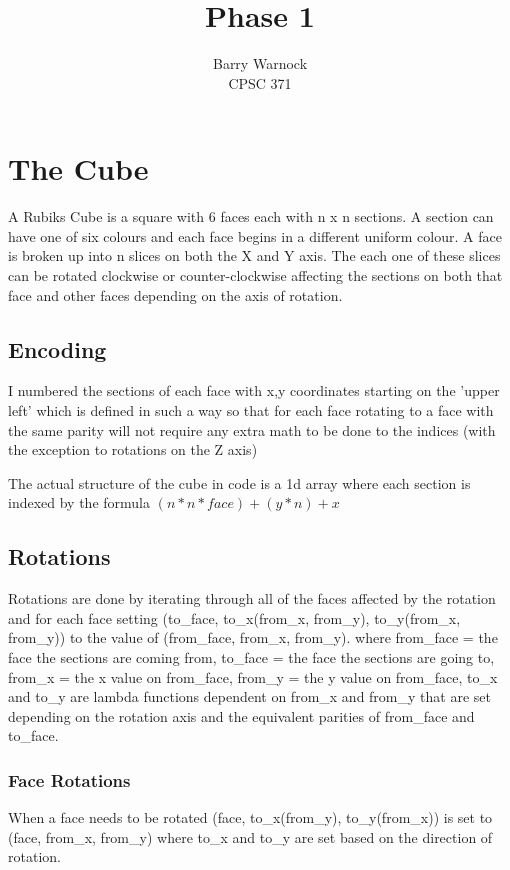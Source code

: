 \documentclass{article}
\begin{document}
\title{Phase 1}
\author{Barry Warnock \\
  CPSC 371 \\}
\maketitle{}
\section{The Cube}
A Rubiks Cube is a square with 6 faces each with n x n sections. A section can have one of six colours and each face begins in a different
uniform colour. A face is broken up into n slices on both the X and Y axis. The each one of these slices can be rotated clockwise or counter-clockwise
affecting the sections on both that face and other faces depending on the axis of rotation.
\subsection{Encoding}
I numbered the sections of each face with x,y coordinates starting on the 'upper left' which is defined in such a way so that for each face rotating
to a face with the same parity will not require any extra math to be done to the indices (with the exception to rotations on the Z axis)

The actual structure of the cube in code is a 1d array where each section is indexed by the formula $(n*n*face)+(y*n)+x$
\subsection{Rotations}
Rotations are done by iterating through all of the faces affected by the rotation and for each face setting (to\_face, to\_x(from\_x, from\_y),
to\_y(from\_x, from\_y)) to the value of (from\_face, from\_x, from\_y). where from\_face = the face the sections are coming from, to\_face = the face
the sections are going to, from\_x = the x value on from\_face, from\_y = the y value on from\_face, to\_x and to\_y are lambda functions dependent on
from\_x and from\_y that are set depending on the rotation axis and the equivalent parities of from\_face and to\_face.

\subsubsection{Face Rotations}
When a face needs to be rotated (face, to\_x(from\_y), to\_y(from\_x)) is set to (face, from\_x, from\_y) where to\_x and to\_y are set based on the
direction of rotation.
\end{document}
